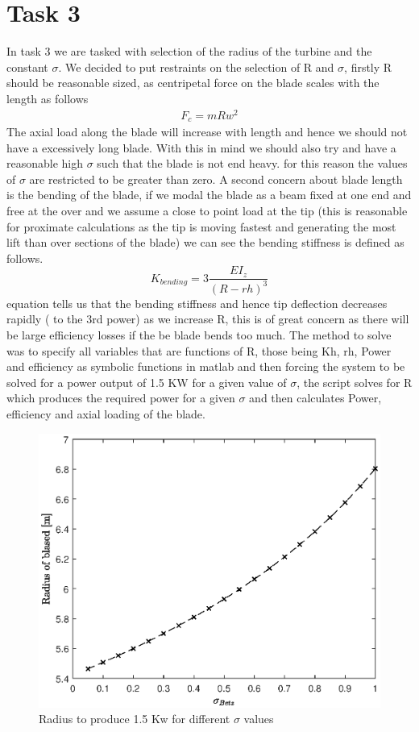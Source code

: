 \documentclass[11pt,a4paper]{article}
\begin{document}
\section*{Task 3}
In task 3 we are tasked with selection of the radius of the turbine and the constant $\sigma$. We decided to put restraints on the selection of R and $\sigma$, firstly R should be reasonable sized, as centripetal force on the blade scales with the length as follows
\begin{eqnarray}
F_c = m R w^2
\end{eqnarray}
The axial load along the blade will increase with length and hence we should not have a excessively long blade. With this in mind we should also try and have a reasonable high $\sigma$ such that the blade is not end heavy. for this reason the values of $\sigma$ are restricted to be greater than zero. A second concern about blade length is the bending of the blade, if we modal the blade as a beam fixed at one end and free at the over and we assume a close to point load at the tip (this is reasonable for proximate calculations as the tip is moving fastest and generating the most lift than over sections of the blade) we can see the bending stiffness is defined as follows.
\begin{equation}
K_{bending} = 3 \frac{E I_z}{(R-rh)^3}
\end{equation}
equation tells us that the bending stiffness and hence tip deflection decreases rapidly ( to the 3rd power) as we increase R, this is of great concern as there will be large efficiency losses if the be blade bends too much.
The method to solve was to specify all variables that are functions of R, those being Kh, rh, Power and efficiency as symbolic functions in matlab and then forcing the system to be solved for a power output of 1.5 KW for a given value of $\sigma$, the script solves for R which produces the required power for a given $\sigma$ and then calculates Power, efficiency and axial loading of the blade.
\begin{figure}[H]
\centering
\includegraphics[width=300pts]{RADIUS.eps}
\caption{Radius to produce 1.5 Kw for different $\sigma$ values}
\end{figure}
\end{document}
